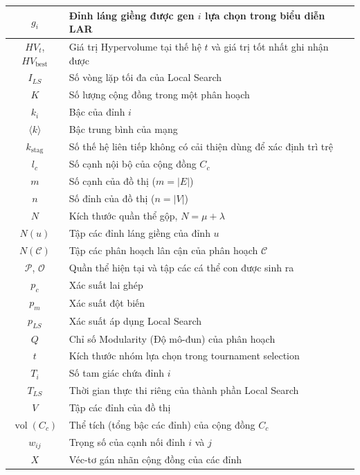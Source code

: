 \documentclass[14pt,a4paper]{extarticle}
\begin{document}
\begin{longtable}{|c|p{}|}
    $g_i$ & Đỉnh láng giềng được gen $i$ lựa chọn trong biểu diễn LAR \\ \hline
    $HV_t$, $HV_{\mathrm{best}}$ & Giá trị Hypervolume tại thế hệ $t$ và giá trị tốt nhất ghi nhận được \\ \hline
    $I_{LS}$ & Số vòng lặp tối đa của Local Search \\ \hline
    $K$ & Số lượng cộng đồng trong một phân hoạch \\ \hline
    $k_i$ & Bậc của đỉnh $i$ \\ \hline
    $\langle k \rangle$ & Bậc trung bình của mạng \\ \hline
    $k_{\mathrm{stag}}$ & Số thế hệ liên tiếp không có cải thiện dùng để xác định trì trệ \\ \hline
    $l_c$ & Số cạnh nội bộ của cộng đồng $C_c$ \\ \hline
    $m$ & Số cạnh của đồ thị ($m = |E|$) \\ \hline
    $n$ & Số đỉnh của đồ thị ($n = |V|$) \\ \hline
    $N$ & Kích thước quần thể gộp, $N=\mu+\lambda$ \\ \hline
    $N(u)$ & Tập các đỉnh láng giềng của đỉnh $u$ \\ \hline
    $N(\mathcal{C})$ & Tập các phân hoạch lân cận của phân hoạch $\mathcal{C}$ \\ \hline
    $\mathcal{P}$, $\mathcal{O}$ & Quần thể hiện tại và tập các cá thể con được sinh ra \\ \hline
    $p_c$ & Xác suất lai ghép \\ \hline
    $p_m$ & Xác suất đột biến \\ \hline
    $p_{LS}$ & Xác suất áp dụng Local Search \\ \hline
    $Q$ & Chỉ số Modularity (Độ mô-đun) của phân hoạch \\ \hline
    $t$ & Kích thước nhóm lựa chọn trong tournament selection \\ \hline
    $T_i$ & Số tam giác chứa đỉnh $i$ \\ \hline
    $T_{LS}$ & Thời gian thực thi riêng của thành phần Local Search \\ \hline
    $V$ & Tập các đỉnh của đồ thị \\ \hline
    $\operatorname{vol}(C_c)$ & Thể tích (tổng bậc các đỉnh) của cộng đồng $C_c$ \\ \hline
    $w_{ij}$ & Trọng số của cạnh nối đỉnh $i$ và $j$ \\ \hline
    $X$ & Véc-tơ gán nhãn cộng đồng của các đỉnh \\ \hline

\end{longtable}
\end{document}
